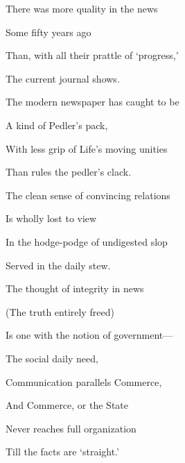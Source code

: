 \documentclass[openany,nobib]{tufte-book}
\begin{document}
\begin{Large}

\noindent There was more quality in the news

\noindent\hspace{.15in} Some fifty years ago

\noindent Than, with all their prattle of `progress,'

\noindent\hspace{.15in} The current journal shows.

\vspace{.1in}

\noindent The modern newspaper has caught to be

\noindent\hspace{.15in} A kind of Pedler's pack,


\noindent With less grip of Life's moving unities

\noindent\hspace{.15in} Than rules the pedler's clack.

\vspace{.1in}

\noindent The clean sense of convincing relations

\noindent\hspace{.15in} Is wholly lost to view

\noindent In the hodge-podge of undigested slop

\noindent\hspace{.15in} Served in the daily stew.

\vspace{.1in}

\noindent The thought of integrity in news

\noindent\hspace{.15in} (The truth entirely freed)

\noindent Is one with the notion of government---

\noindent\hspace{.15in} The social daily need,

\vspace{.1in}

\noindent Communication parallels Commerce,

\noindent\hspace{.15in} And Commerce, or the State

\noindent Never reaches full organization

\noindent\hspace{.15in} Till the facts are `straight.'

\end{Large}
\end{document}
